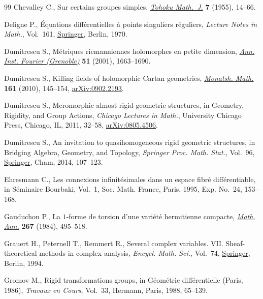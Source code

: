 \documentclass[pdftex]{sigma}
\numberwithin{equation}{section}
\begin{document}
\begin{thebibliography}{99}
Chevalley C., Sur certains groupes simples, \href{https://doi.org/10.2748/tmj/1178245104}{\textit{Tohoku Math.~J.}} \textbf{7}
 (1955), 14--66.

Deligne P., \'Equations diff\'erentielles \`a points singuliers r\'eguliers,
 \textit{Lecture Notes in Math.}, Vol.~161, \href{https://doi.org/10.1007/BFb0061194}{Springer}, Berlin, 1970.

Dumitrescu S., M\'etriques riemanniennes holomorphes en petite dimension,
 \href{https://doi.org/10.5802/aif.1870}{\textit{Ann. Inst. Fourier (Grenoble)}} \textbf{51} (2001), 1663--1690.

Dumitrescu S., Killing fields of holomorphic {C}artan geometries,
 \href{https://doi.org/10.1007/s00605-009-0135-x}{\textit{Monatsh. Math.}} \textbf{161} (2010), 145--154, \href{https://arxiv.org/abs/0902.2193}{arXiv:0902.2193}.

Dumitrescu S., Meromorphic almost rigid geometric structures, in Geometry,
 Rigidity, and Group Actions, \textit{Chicago Lectures in Math.}, University Chicago
 Press, Chicago, IL, 2011, 32--58, \href{https://arxiv.org/abs/0805.4506}{arXiv:0805.4506}.

Dumitrescu S., An invitation to quasihomogeneous rigid geometric structures, in
 Bridging Algebra, Geometry, and Topology, \textit{Springer Proc. Math.
 Stat.}, Vol.~96, \href{https://doi.org/10.1007/978-3-319-09186-0_7}{Springer}, Cham, 2014, 107--123.

Ehresmann C., Les connexions infinit\'esimales dans un espace fibr\'e
 diff\'erentiable, in S\'eminaire {B}ourbaki, {V}ol.~1, Soc. Math. France,
 Paris, 1995, Exp. No.~24, 153--168.

Gauduchon P., La {$1$}-forme de torsion d'une vari\'et\'e hermitienne compacte,
 \href{https://doi.org/10.1007/BF01455968}{\textit{Math. Ann.}} \textbf{267} (1984), 495--518.

Grauert H., Peternell T., Remmert R., Several complex variables. {VII}.
 Sheaf-theoretical methods in complex analysis, \textit{Encycl. Math. Sci.}, Vol.~74, \href{https://doi.org/10.1007/978-3-662-09873-8}{Springer}, Berlin, 1994.

Gromov M., Rigid transformations groups, in G\'eom\'etrie diff\'erentielle
 ({P}aris, 1986), \textit{Travaux en Cours}, Vol.~33, Hermann, Paris, 1988,
 65--139.


\end{thebibliography}
\end{document}
